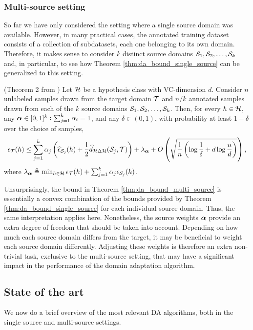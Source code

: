\subsubsection{Multi-source setting}
\label{sec:da_theory_ms}
So far we have only considered the setting where a single source domain was available. However, in many practical cases, the annotated training dataset consists of a collection of subdatasets, each one belonging to its own domain. Therefore, it makes sense to consider $k$ distinct source domains ${\mathcal{S}}_1, {\mathcal{S}}_2, \dots, {\mathcal{S}}_k$ and, in particular, to see how Theorem \ref{thm:da_bound_single_source} can be generalized to this setting.
\begin{theorem}
	\label{thm:da_bound_multi_source}
	(Theorem 2 from \citet{Zhao2018}) Let ${\mathcal{H}}$ be a hypothesis class with VC-dimension $d$. Consider $n$ unlabeled samples drawn from the target domain ${\mathcal{T}}$ and $n/k$ annotated samples drawn from each of the $k$ source domains ${\mathcal{S}}_1, {\mathcal{S}}_2, \dots, {\mathcal{S}}_k$. Then, for every $h \in {\mathcal{H}}$, any ${\bm{\alpha}} \in [0,1]^k: \sum_{j=1}^k {\alpha}_i = 1$, and any $\delta \in (0,1)$, with probability at least $1-\delta$ over the choice of samples,
	\begin{equation}
		\label{eq:da_bound_multi_source}
		\epsilon_{\mathcal{T}}(h) \leq \sum_{j=1}^k {\alpha}_j \left(\widehat{\epsilon}_{{\mathcal{S}}_j}(h) + \frac{1}{2} \widehat{d}_{{\mathcal{H}} \Delta {\mathcal{H}}}({\mathcal{S}}_j, {\mathcal{T}})\right) + \lambda_{\bm{\alpha}} + O \left(\sqrt{\frac{1}{n} \left(\log \frac{1}{\delta} +d \log \frac{n}{d} \right)} \right),
	\end{equation}
	where $\lambda_{\bm{\alpha}} \triangleq \min_{h \in {\mathcal{H}}} \epsilon_{\mathcal{T}}(h) + \sum_{j=1}^k {\alpha}_j \epsilon_{{\mathcal{S}}_j}(h)$.
\end{theorem}
Unsurprisingly, the bound in Theorem \ref{thm:da_bound_multi_source} is essentially a convex combination of the bounds provided by Theorem \ref{thm:da_bound_single_source} for each individual source domain. Thus, the same interpretation applies here. Nonetheless, the source weights ${\bm{\alpha}}$ provide an extra degree of freedom that should be taken into account. Depending on how much each source domain differs from the target, it may be beneficial to weight each source domain differently. Adjusting these weights is therefore an extra non-trivial task, exclusive to the multi-source setting, that may have a significant impact in the performance of the domain adaptation algorithm.

\subsection{State of the art}
\label{sec:da_sota}
We now do a brief overview of the most relevant DA algorithms, both in the single source and multi-source settings. 

